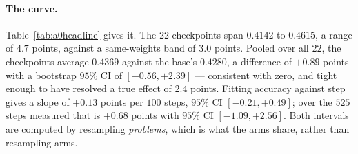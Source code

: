\paragraph{The curve.} Table~\ref{tab:a0headline} gives it. The $22$ checkpoints span
$0.4142$ to $0.4615$, a range of $4.7$ points, against a same-weights band of $3.0$ points.
Pooled over all $22$, the checkpoints average $0.4369$ against the base's $0.4280$, a
difference of $+0.89$ points with a bootstrap $95\%$ CI of $[-0.56,+2.39]$ --- consistent with
zero, and tight enough to have resolved a true effect of $2.4$ points. Fitting accuracy
against step gives a slope of $+0.13$ points per $100$ steps, $95\%$ CI
$[-0.21,+0.49]$; over the $525$ steps measured that is $+0.68$ points with $95\%$ CI
$[-1.09,+2.56]$. Both intervals are computed by resampling \emph{problems}, which is what the
arms share, rather than resampling arms.

